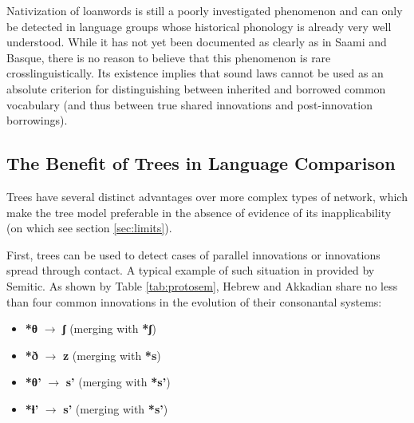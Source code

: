 \documentclass[svgnames,12pt]{scrartcl}
\newcommand{\ipa}[1]{\textbf{{\phon\mbox{#1}}}}
\begin{document}
Nativization of loanwords is still a poorly investigated phenomenon and can only be detected in language groups whose historical phonology is already very well understood. While it has not yet been documented as clearly as in Saami and Basque, there is no reason to believe that this phenomenon is rare crosslinguistically. Its existence implies that sound laws cannot be used as an absolute criterion for distinguishing between inherited and borrowed common vocabulary (and thus between true shared innovations and post-innovation borrowings).

 
\subsection{The Benefit of Trees in Language Comparison}
Trees have several distinct advantages over more complex types of network, which make the tree model preferable in the absence of evidence of its inapplicability (on which see section \ref{sec:limits}).

First, trees can be used to detect cases of parallel innovations or innovations spread through contact. A typical example of such situation in provided by Semitic. As shown by Table \ref{tab:protosem}, Hebrew and Akkadian share no less than four common innovations in the evolution of their consonantal systems: 
\begin{itemize}
\item \ipa{*θ} $\rightarrow$ \ipa{ʃ} (merging with \ipa{*ʃ})
\item \ipa{*ð} $\rightarrow$ \ipa{z} (merging with \ipa{*s})
\item \ipa{*θ'} $\rightarrow$ \ipa{s'} (merging with \ipa{*s'})
\item \ipa{*ɬ'} $\rightarrow$ \ipa{s'} (merging with \ipa{*s'})
\end{itemize}
\end{document}

